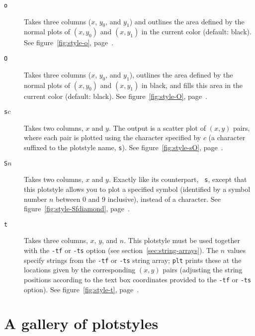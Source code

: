 \documentclass{book}
\begin{document}
\begin{description}
\item[{\tt o}]
%
%
Takes three columns ($x$, $y_0$, and $y_1$) and outlines the area defined
by the normal plots of $(x,y_0)$ and $(x,y_1)$ in the current color (default:
black).
See figure~\ref{fig:style-o}, page~\pageref{fig:style-o}.

\item[{\tt O}]
%
%
Takes three columns ($x$, $y_0$, and $y_1$), outlines the area defined
by the normal plots of $(x,y_0)$ and $(x,y_1)$ in black, and fills this
area in the current color (default: black).
See figure~\ref{fig:style-O}, page~\pageref{fig:style-O}.

\item[{\tt s$c$}]
%
Takes two columns, $x$ and $y$.  The output is a scatter plot of $(x,y)$
pairs, where each pair is plotted using the character specified by $c$
(a character suffixed to the plotstyle name, {\tt s}).
See figure~\ref{fig:style-sO}, page~\pageref{fig:style-sO}.

\item[{\tt S$n$}]
%
Takes two columns, $x$ and $y$.  Exactly like its counterpart, {\tt
s}, except that this plotstyle allows you to plot a specified symbol
(identified by a symbol number $n$ between 0 and 9 inclusive), instead
of a character.
See figure~\ref{fig:style-Sfdiamond}, page~\pageref{fig:style-Sfdiamond}.

\item[{\tt t}]
%
%
Takes three columns, $x$, $y$, and $n$.  
This plotstyle must be used together with the {\tt -tf} or {\tt -ts}
option (see section~\ref{sec:string-arrays}).  The $n$ values specify strings
from the {\tt -tf} or {\tt -ts} string array;  {\tt plt} prints these
at the locations given by the corresponding $(x,y)$ pairs (adjusting the
string positions according to the text box coordinates provided to the
{\tt -tf} or {\tt -ts} option). See figure~\ref{fig:style-t},
page~\pageref{fig:style-t}.
\end{description}

\section{A gallery of plotstyles}
\end{document}

